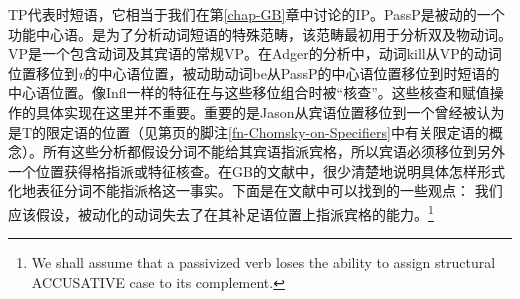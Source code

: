 TP代表时短语，它相当于我们在第\ref{chap-GB}章中讨论的IP。PassP是被动的一个功能中心语。\vPc{}是为了分析动词短语的特殊范畴，该范畴最初用于分析双及物动词\citep{Larson88a}。VP是一个包含动词及其宾语的常规VP。在Adger的分析中，动词kill从VP的动词位置移位到\textit{v}的中心语位置，被动助动词be从PassP的中心语位置移位到时短语的中心语位置。像Infl一样的特征在与这些移位组合时被“核查”。这些核查和赋值操作的具体实现在这里并不重要。重要的是Jason从宾语位置移位到一个曾经被认为是T的限定语的位置（见第\pageref{fn-Chomsky-on-Specifiers}页的脚注\ref{fn-Chomsky-on-Specifiers}中有关限定语的概念）。所有这些分析都假设分词不能给其宾语指派宾格，所以宾语必须移位到另外一个位置获得格指派或特征核查。在GB的文献中，很少清楚地说明具体怎样形式化地表征分词不能指派格这一事实。下面是在文献中可以找到的一些观点：
\eal
\ex 我们应该假设，被动化的动词失去了在其补足语位置上指派宾格的能力。\footnote{%
We shall assume that a passivized verb loses the ability to assign structural ACCUSATIVE case to
its complement.}\citep[]{Haegeman94a-u}

